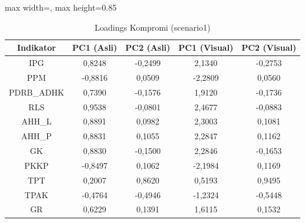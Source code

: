 \begin{table}[H]
\centering
\caption{Loadings Kompromi (scenario1)} \label{tab:app1loadings}
\begin{adjustbox}{max width=\textwidth, max height=0.85\textheight}
\begin{tabular}{|c|c|c|c|c|}
\hline
\textbf{Indikator} & \textbf{PC1 (Asli)} & \textbf{PC2 (Asli)} & \textbf{PC1 (Visual)} & \textbf{PC2 (Visual)} \\
\hline
IPG & 0,8248 & -0,2499 & 2,1340 & -0,2753 \\
PPM & -0,8816 & 0,0509 & -2,2809 & 0,0560 \\
PDRB\_ADHK & 0,7390 & -0,1576 & 1,9120 & -0,1736 \\
RLS & 0,9538 & -0,0801 & 2,4677 & -0,0883 \\
AHH\_L & 0,8891 & 0,0982 & 2,3003 & 0,1081 \\
AHH\_P & 0,8831 & 0,1055 & 2,2847 & 0,1162 \\
GK & 0,8830 & -0,1500 & 2,2846 & -0,1653 \\
PKKP & -0,8497 & 0,1062 & -2,1984 & 0,1169 \\
TPT & 0,2007 & 0,8620 & 0,5193 & 0,9495 \\
TPAK & -0,4764 & -0,4946 & -1,2324 & -0,5448 \\
GR & 0,6229 & 0,1391 & 1,6115 & 0,1532 \\
\hline
\end{tabular}
\end{adjustbox}
\end{table}